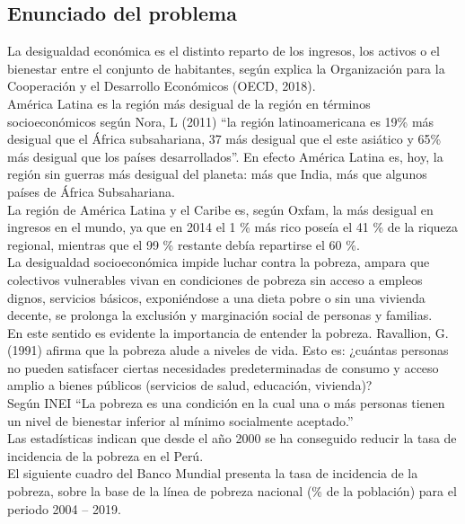 \subsection{Enunciado del problema}

La desigualdad económica es el distinto reparto de los ingresos, los activos o el bienestar entre el conjunto de habitantes, según explica la Organización para la Cooperación y el Desarrollo Económicos (OECD, 2018).\\
América Latina es la región más desigual de la región en términos socioeconómicos según Nora, L (2011) “la región latinoamericana es 19\% más desigual que el África subsahariana, 37 más desigual que el este asiático y 65\% más desigual que los países desarrollados”.  En efecto América Latina es, hoy, la región sin guerras más desigual del planeta: más que India, más que algunos países de África Subsahariana.\\
La región de América Latina y el Caribe es, según Oxfam, la más desigual en ingresos en el mundo, ya que en 2014 el 1 \% más rico poseía el 41 \% de la riqueza regional, mientras que el 99 \% restante debía repartirse el 60 \%.\\
La desigualdad socioeconómica impide luchar contra la pobreza, ampara que colectivos vulnerables vivan en condiciones de pobreza sin acceso a empleos dignos, servicios básicos, exponiéndose a una dieta pobre o sin una vivienda decente, se prolonga la exclusión y marginación social de personas y familias. \\
En este sentido es evidente la importancia de entender la pobreza.
Ravallion, G. (1991) afirma que la pobreza alude a niveles de vida.  Esto es: ¿cuántas personas no pueden satisfacer ciertas necesidades predeterminadas de consumo y acceso amplio a bienes públicos (servicios de salud, educación, vivienda)?  \\
Según INEI “La pobreza es una condición en la cual una o más personas tienen un nivel de bienestar inferior al mínimo socialmente aceptado.”\\
Las estadísticas indican que desde el año 2000 se ha conseguido reducir la tasa de incidencia de la pobreza en el Perú. \\
El siguiente cuadro del Banco Mundial presenta la tasa de incidencia de la pobreza, sobre la base de la línea de pobreza nacional (\% de la población) para el periodo 2004 – 2019.\\








